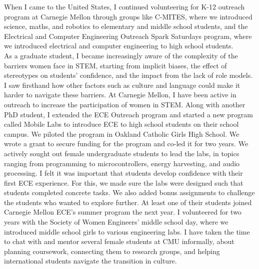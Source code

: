 \documentclass[10pt]{article}
\begin{document}
When I came to the United States, I continued volunteering for K-12 outreach program at Carnegie Mellon through groups like C-MITES, where we introduced science, maths, and robotics to elementary and middle school students, and the Electrical and Computer Engineering Outreach Spark Saturdays program, where we introduced electrical and computer engineering to high school students. \\


As a graduate student, I became increasingly aware of the complexity of the barriers women face in STEM, starting from implicit biases, the effect of stereotypes on students' confidence, and the impact from the lack of role models. I saw firsthand how other factors such as culture and language could make it harder to navigate these barriers. %
At Carnegie Mellon, I have been active in outreach to increase the participation of women in STEM. %
Along with another PhD student, I extended the ECE Outreach program and started a new program called Mobile Labs to introduce ECE to high school students on their school campus. We piloted the program in Oakland Catholic Girls High School.  We wrote a grant to secure funding for the program and co-led it for two years. We actively sought out female undergraduate students to lead the labs, in topics ranging from programming to microcontrollers, energy harvesting, and audio processing. I felt it was important that students develop confidence with their first ECE experience. For this, we made sure the labs were designed such that students completed concrete tasks. We also added bonus assignments to challenge the students who wanted to explore further.  At least one of their students joined Carnegie Mellon ECE's summer program the next year. I volunteered for two years with the Society of Women Engineers' middle school day, where we introduced middle school girls to various engineering labs. I have taken the time to chat with and mentor several female students at CMU informally, about planning coursework, connecting them to research groups, and helping international students navigate the transition in culture.\\ %
\end{document}
